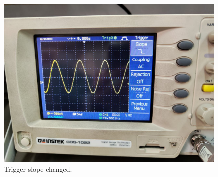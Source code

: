 \documentclass[11pt]{article}
\newcommand{\PicScale}{0.2}
\begin{document}
\begin{question}
{        \begin{figure}[H]
            \begin{center}
                \includegraphics[scale=\PicScale]{Fig/52.jpeg}
                \caption{Trigger slope changed.}
            \end{center}
        \end{figure}
        
}
\end{question}
\end{document}
